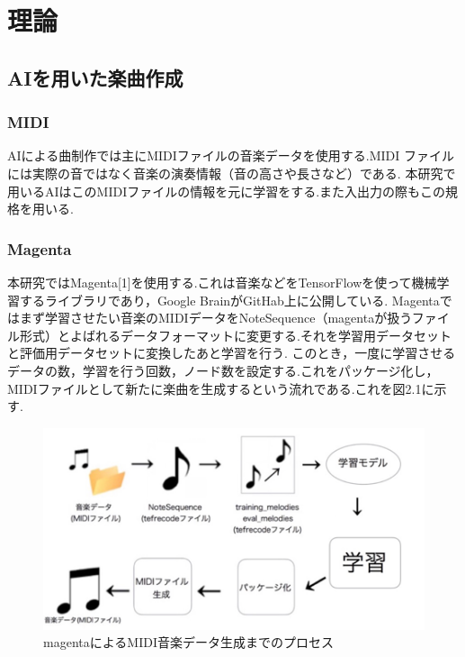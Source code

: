 \chapter{理論}
\section{AIを用いた楽曲作成}
\subsection{MIDI}
AIによる曲制作では主にMIDIファイルの音楽データを使用する.MIDI ファイルには実際の音ではなく音楽の演奏情報（音の高さや長さなど）である.
本研究で用いるAIはこのMIDIファイルの情報を元に学習をする.また入出力の際もこの規格を用いる.
\subsection{Magenta}
本研究ではMagenta[1]を使用する.これは音楽などをTensorFlowを使って機械学習するライブラリであり，Google BrainがGitHab上に公開している.
Magentaではまず学習させたい音楽のMIDIデータをNoteSequence（magentaが扱うファイル形式）とよばれるデータフォーマットに変更する.それを学習用データセットと評価用データセットに変換したあと学習を行う.
このとき，一度に学習させるデータの数，学習を行う回数，ノード数を設定する.これをパッケージ化し，MIDIファイルとして新たに楽曲を生成するという流れである.これを図2.1に示す.
\begin{figure}[h]
    \begin{screen}
    \begin{center}
        \includegraphics[scale=1.5, clip]{./img/magenta_usestep.png}
        \caption{magentaによるMIDI音楽データ生成までのプロセス}
        \label{fig:magentaによるMIDI音楽データ生成までのプロセス}
    \end{center}
    \end{screen}
\end{figure}\\
\newpage
